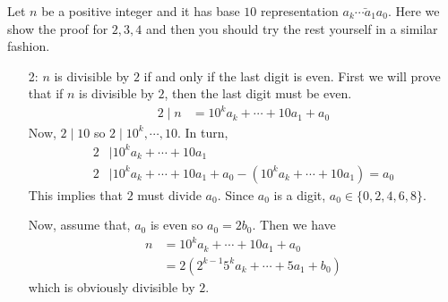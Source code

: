 \documentclass[problems.tex]{subfile}
\begin{document}
	\begin{solution}
		Let $n$ be a positive integer and it has base $10$ representation $\bar{a_k\cdots a_1a_0}$. Here we show the proof for $2,3,4$ and then you should try the rest yourself in a similar fashion.
			\begin{enumerate}
				\item[2:] $n$ is divisible by $2$ if and only if the last digit is even. First we will prove that if $n$ is divisible by $2$, then the last digit must be even.
						\begin{align*}
							2\mid n & = 10^ka_k+\cdots+10a_1+a_0
						\end{align*}
					Now, $2\mid 10$ so $2\mid 10^k,\cdots,10$. In turn,
						\begin{align*}
							2 & \mid 10^ka_k+\cdots+10a_1\\
							2 & \mid 10^ka_k+\cdots+10a_1+a_0-(10^ka_k+\cdots+10a_1)=a_0
						\end{align*}
					This implies that $2$ must divide $a_0$. Since $a_0$ is a digit, $a_0\in\{0,2,4,6,8\}$.

					Now, assume that, $a_0$ is even so $a_0=2b_0$. Then we have
						\begin{align*}
							n & = 10^ka_k+\cdots+10a_1+a_0\\
							  & = 2(2^{k-1}5^ka_k+\cdots+5a_1+b_0)
						\end{align*}
					which is obviously divisible by $2$.


\end{enumerate}
\end{solution}
\end{document}
